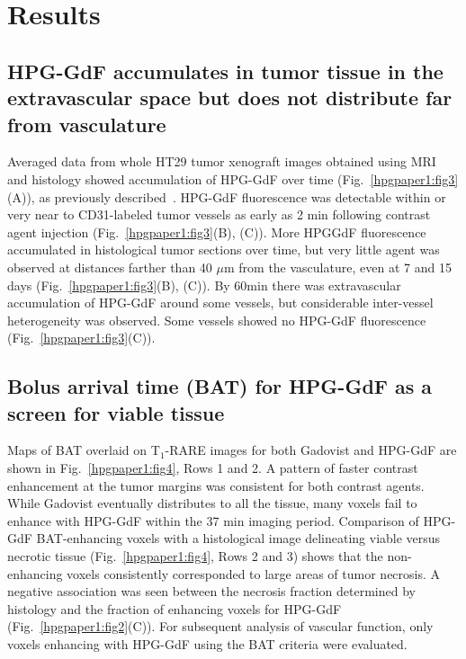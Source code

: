 \section{Results}

\subsection{HPG-GdF accumulates in tumor tissue in the extravascular space but does not distribute far from vasculature}

Averaged data from whole HT29 tumor xenograft images obtained using MRI and histology showed accumulation of HPG-GdF over time (Fig.~\ref{hpgpaper1:fig3}(A)), as previously described~\cite{Saatchi:2012hc}.
HPG-GdF fluorescence was detectable within or very near to CD31-labeled tumor vessels as early as 2 min following contrast agent injection (Fig.~\ref{hpgpaper1:fig3}(B), (C)).
More HPGGdF fluorescence accumulated in histological tumor sections over time, but very little agent was observed at distances farther than 40 $\mu$m from the vasculature, even at 7 and 15 days (Fig.~\ref{hpgpaper1:fig3}(B), (C)).
By 60min there was extravascular accumulation of HPG-GdF around some vessels, but considerable inter-vessel heterogeneity was observed.
Some vessels showed no HPG-GdF fluorescence (Fig.~\ref{hpgpaper1:fig3}(C)).

\subsection{Bolus arrival time (BAT) for HPG-GdF as a screen for viable tissue}

Maps of BAT overlaid on T$_1$-RARE images for both Gadovist and HPG-GdF are shown in Fig.~\ref{hpgpaper1:fig4}, Rows 1 and 2.
A pattern of faster contrast enhancement at the tumor margins was consistent for both contrast agents.
While Gadovist eventually distributes to all the tissue, many voxels fail to enhance with HPG-GdF within the 37 min imaging period.
Comparison of HPG-GdF BAT-enhancing voxels with a histological image delineating viable versus necrotic tissue (Fig.~\ref{hpgpaper1:fig4}, Rows 2 and 3) shows that the non-enhancing voxels consistently corresponded to large areas of tumor necrosis.
A negative association was seen between the necrosis fraction determined by histology and the fraction of enhancing voxels for HPG-GdF (Fig.~\ref{hpgpaper1:fig2}(C)).
For subsequent analysis of vascular function, only voxels enhancing with HPG-GdF using the BAT criteria were evaluated.

